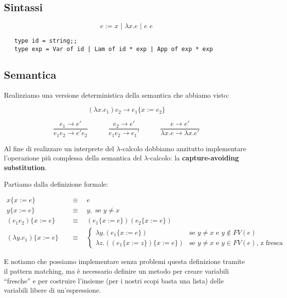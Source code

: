 \documentclass[a4paper,10pt]{article}
\begin{document}
 \subsection{Sintassi}
  \[ e := x \,\,|\,\, \lambda x.e \,\,|\,\, e\,\,e \]
  
  \begin{lstlisting}
   type id = string;;
   type exp = Var of id | Lam of id * exp | App of exp * exp\end{lstlisting}

 \subsection{Semantica}
  Realizziamo una versione deterministica della semantica che abbiamo visto:
  
   \[ (\lambda x.e_1)e_2 \to  e_1 \{ x:=e_2 \}\]
 
  \[ \dfrac{e_1 \to e'}{e_1e_2 \to e'e_2} \quad\quad\quad \dfrac{e_2 \to e'}{e_1e_2 \to e_1'} \quad\quad\quad \dfrac{e \to e'}{\lambda x.e \to \lambda x .e'}\]
  
  Al fine di realizzare un interprete del $\lambda$-calcolo dobbiamo anzitutto implementare l'operazione più complessa della semantica del $\lambda$-calcolo: la \textbf{capture-avoiding substitution}.\smallskip
 
 Partiamo dalla definizione formale:
 
 \[\begin{aligned}
   x\{x := e\} \quad &\equiv\quad  e\\
   y\{x := e\} \quad &\equiv\quad  y, \text{ se } y \neq x\\
   (e_1 e_2)\{x := e\}\quad &\equiv\quad (e_1\{x:=e\})(e_2\{x:=e\})\\
   (\lambda y.e_1)\{ x:=e \}\quad &\equiv\quad  \begin{cases}
                                                    \lambda y.(e_1\{ x:=e \}) &\text{se $y \neq x$ e $y \notin FV(e)$}\\
                                                    \lambda z.((e_1\{ x:=z \})\{ x:=e \}) &\text{se $y \neq x$ e $y \in FV(e)$, z fresca}
                                               \end{cases}
  \end{aligned}
\]
 
 E notiamo che possiamo implementare senza problemi questa definizione tramite il pattern matching, ma è necessario definire un metodo per creare variabili ``fresche'' e per costruire l'insieme (per i nostri scopi basta una lista) delle variabili libere di un'espressione.
 \newpage
\end{document}
